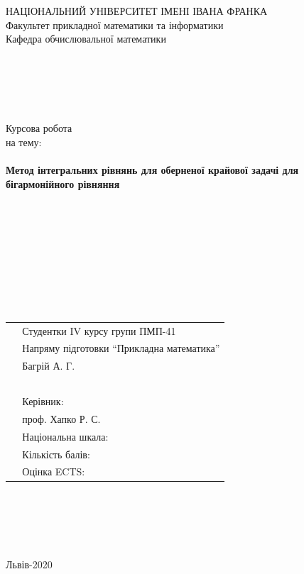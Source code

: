 \documentclass[12pt]{report}
\begin{document}
\begin{titlepage}
		\begin{center}
			{ НАЦІОНАЛЬНИЙ УНІВЕРСИТЕТ ІМЕНІ ІВАНА ФРАНКА}\\
			{\Large Факультет прикладної математики та інформатики \\
			 Кафедра обчислювальної математики}
		\end{center}
	    \leavevmode \\
	    \leavevmode \\
	    \leavevmode \\
	    \leavevmode \\
		\begin{center}
			{\LARGE  Курсова робота\\}
			 на тему: \\
			\leavevmode \\
		    {\Huge \textbf{Метод інтегральних рівнянь для оберненої крайової задачі для бігармонійного рівняння}}			
		\end{center}
	    \leavevmode \\
	    \leavevmode \\
	    \leavevmode \\
	    \leavevmode \\	
	    \leavevmode \\
	    \leavevmode \\
	    \leavevmode \\
	    \leavevmode \\     
	        \begin{tabular}{p{7cm}p{12cm}}
	    	    \, & {\large Студентки IV курсу групи ПМП-41} \\
	    	    \, & {\large Напряму підготовки ``Прикладна математика''} \\
	    	    \, & {\large Багрій А. Г.} \\
	    	    \, & \, \\
	    	    \, & {\large Керівник:} \\
	    	    \, & {\large проф. Хапко Р. С.} \\
	    	    \, & {\large Національна шкала: \underline{\hspace{3cm}}} \\
	    	    \, & {\large Кількість балів: \underline{\hspace{3cm}}} \\
		    \, & {\large Оцінка ECTS: \underline{\hspace{3cm}}}
	        \end{tabular}
        \leavevmode \\
        \leavevmode \\
        \leavevmode \\
        \leavevmode \\
        \vfill
        \begin{center}
        	{\Large Львів-2020}
        \end{center}
\end{titlepage}
\end{document}
